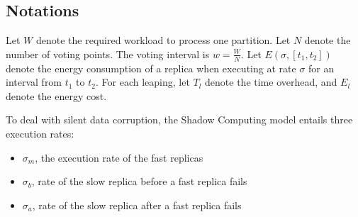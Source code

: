 
\subsection{Notations}
Let $W$ denote the required workload to process one partition. Let $N$ denote the number of voting points. The voting interval is $w=\frac{W}{N}$. 
Let $E(\sigma, [t_1, t_2])$ denote the energy consumption of a replica when executing at rate $\sigma$ for an interval from $t_1$ to $t_2$. For each leaping, let $T_l$ denote the time overhead, and $E_l$ denote the energy cost.

To deal with silent data corruption, the Shadow Computing model entails three execution rates:
\begin{itemize}
	\item $\sigma_m$, the execution rate of the fast replicas 
    \item $\sigma_b$, rate of the slow replica before a fast replica fails
    \item $\sigma_a$, rate of the slow replica after a fast replica fails
\end{itemize}

